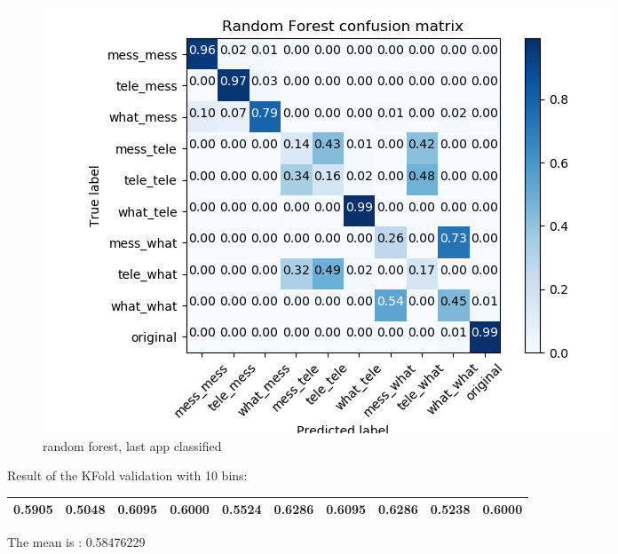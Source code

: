  \begin{figure}[H] 
\centering 
\includegraphics[scale=.6]{images/rf_initial_double_complete.png} 
\caption{random forest, last app classified} 
\end{figure} 


Result of the KFold validation with 10 bins:
 {\def\arraystretch{1.3} 
 \begin{table}[H] 
\centering 
\begin{tabular}{|l |l |l |l |l |l |l |l |l |l |}  
\hline 
0.5905&
0.5048&
0.6095&
0.6000&
0.5524&
0.6286&
0.6095&
0.6286&
0.5238&
0.6000\\ \hline  

\end{tabular} 
\end{table} }

The mean is : 0.58476229
